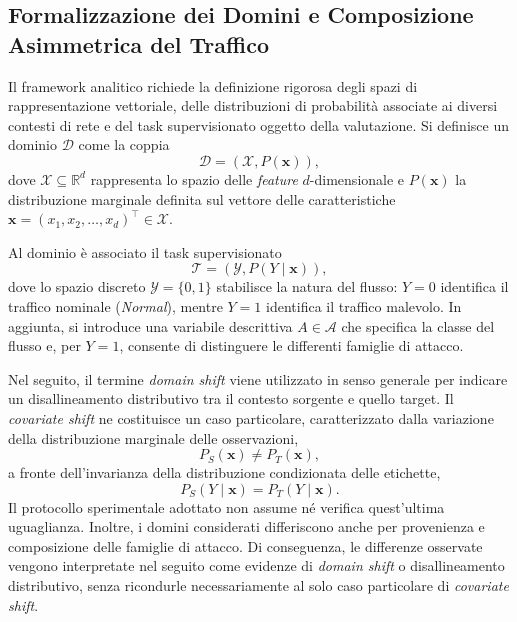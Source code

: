\subsection{Formalizzazione dei Domini e Composizione Asimmetrica del Traffico}
\label{subsec:composizione_domini}

Il framework analitico richiede la definizione rigorosa degli spazi di rappresentazione vettoriale, delle distribuzioni di probabilità associate ai diversi contesti di rete e del task supervisionato oggetto della valutazione. Si definisce un dominio $\mathcal{D}$ come la coppia
\begin{equation}
    \mathcal{D} = \left(\mathcal{X}, P(\mathbf{x})\right),
\end{equation}
dove $\mathcal{X} \subseteq \mathbb{R}^d$ rappresenta lo spazio delle \textit{feature} $d$-dimensionale e $P(\mathbf{x})$ la distribuzione marginale definita sul vettore delle caratteristiche $\mathbf{x} = (x_1, x_2, \dots, x_d)^\top \in \mathcal{X}$.

Al dominio è associato il task supervisionato
\begin{equation}
    \mathcal{T} = \left(\mathcal{Y}, P(Y \mid \mathbf{x})\right),
\end{equation}
dove lo spazio discreto $\mathcal{Y} = \{0,1\}$ stabilisce la natura del flusso: $Y = 0$ identifica il traffico nominale (\textit{Normal}), mentre $Y = 1$ identifica il traffico malevolo. In aggiunta, si introduce una variabile descrittiva $A \in \mathcal{A}$ che specifica la classe del flusso e, per $Y=1$, consente di distinguere le differenti famiglie di attacco.

Nel seguito, il termine \textit{domain shift} viene utilizzato in senso generale per indicare un disallineamento distributivo tra il contesto sorgente e quello target. 
Il \textit{covariate shift} ne costituisce un caso particolare, caratterizzato dalla variazione della distribuzione marginale delle osservazioni,
\begin{equation}
    P_S(\mathbf{x}) \neq P_T(\mathbf{x}),
\end{equation}
a fronte dell'invarianza della distribuzione condizionata delle etichette,
\begin{equation}
    P_S(Y \mid \mathbf{x}) = P_T(Y \mid \mathbf{x}).
\end{equation}
Il protocollo sperimentale adottato non assume né verifica quest'ultima uguaglianza. Inoltre, i domini considerati differiscono anche per provenienza e composizione delle famiglie di attacco. Di conseguenza, le differenze osservate vengono interpretate nel seguito come evidenze di \textit{domain shift} o disallineamento distributivo, senza ricondurle necessariamente al solo caso particolare di \textit{covariate shift}.

